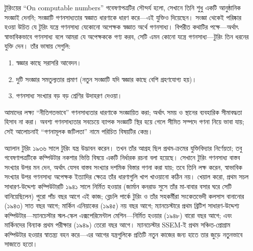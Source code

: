 \documentclass[../../../include/open-logic-section]{subfiles}
\begin{document}
\begin{digress}
টুরিংয়ের “On computable numbers” গবেষণাপত্রটির সৌন্দর্য হলো, সেখানে তিনি
শুধু একটি আনুষ্ঠানিক সংজ্ঞাই দেননি; সংজ্ঞাটি গণনসাধ্যতার স্বজ্ঞাত ধারণাকে
ধারণ করে—এই যুক্তিও দিয়েছেন। সংজ্ঞা থেকেই পরিষ্কার হওয়া উচিত যে টুরিং
যন্ত্রে গণনসাধ্য যেকোনো অপেক্ষক স্বজ্ঞাত অর্থে গণনসাধ্য। বিপরীত কথাটির
পক্ষে—অর্থাৎ স্বাভাবিকভাবে গণনসাধ্য বলে আমরা যে অপেক্ষককে গণ্য করব, সেটি
এমন কোনো যন্ত্রে গণনসাধ্য—টুরিং তিন ধরনের যুক্তি দেন। তাঁর ভাষায় সেগুলি:
\begin{enumerate}
\item স্বজ্ঞার কাছে সরাসরি আবেদন।
\item দুটি সংজ্ঞার সমতুল্যতার প্রমাণ (নতুন সংজ্ঞাটি যদি স্বজ্ঞার কাছে
  বেশি গ্রহণযোগ্য হয়)।
\item গণনসাধ্য সংখ্যার বড় বড় শ্রেণির উদাহরণ দেওয়া।
\end{enumerate}
আমাদের লক্ষ্য “নীতিগতভাবে” গণনসাধ্যতার ধারণাকে সংজ্ঞায়িত করা; অর্থাৎ
সময় ও স্থানের ব্যবহারিক সীমাবদ্ধতা হিসাব না করা। অবশ্য গণনসাধ্যতার
সবচেয়ে ব্যাপক সংজ্ঞাটি স্থির হয়ে গেলে সীমিত সম্পদে গণনা নিয়ে ভাবা যায়;
সেই আলোচনাই “গণনামূলক জটিলতা” নামে পরিচিত বিষয়টির কেন্দ্র।
\end{digress}

\begin{history}
অ্যালান টুরিং ১৯৩৬ সালে টুরিং যন্ত্র উদ্ভাবন করেন। তখন তাঁর আগ্রহ ছিল
প্রথম-ক্রমের যুক্তিবিদ্যার নির্ণেয়তা; তবু গবেষণাপত্রটিকে কম্পিউটার নকশার
ভিত্তি বিষয়ে একটি নির্ধারক রচনা বলা হয়েছে। সেখানে টুরিং গণনসাধ্য বাস্তব
সংখ্যার উপর মন দেন, অর্থাৎ যেসব বাস্তব সংখ্যার দশমিক বিস্তার গণনা করা
যায়; তবে তিনি লক্ষ করেন, স্বাভাবিক সংখ্যার উপর গণনসাধ্য অপেক্ষক ইত্যাদির
ক্ষেত্রে তাঁর ধারণাগুলি খাপ খাওয়ানো কঠিন নয়। খেয়াল করো, প্রথম সচল
সাধারণ-উদ্দেশ্য কম্পিউটারটি ১৯৪১ সালে নির্মিত হওয়ার (জার্মান কনরাড সুসে
তাঁর মা-বাবার বসার ঘরে সেটি বানিয়েছিলেন) পুরো পাঁচ বছর আগে এই কাজ;
ব্লেচলি পার্কে টুরিং ও তাঁর সহকর্মীরা সংকেতভেদী কলসাস বানানোর (১৯৪৩)
সাত বছর আগে; মার্কিন এনিয়াকের (১৯৪৫) নয় বছর আগে; ম্যানচেস্টারে প্রথম
ব্রিটিশ সাধারণ-উদ্দেশ্য কম্পিউটার—ম্যানচেস্টার স্মল-স্কেল এক্সপেরিমেন্টাল
মেশিন—নির্মিত হওয়ার (১৯৪৮) বারো বছর আগে; এবং মার্কিনদের বিন্যাক প্রথম
পরীক্ষার (১৯৪৯) তেরো বছর আগে। ম্যানচেস্টার SSEM-ই প্রথম সঞ্চিত-প্রোগ্রাম
কম্পিউটার হওয়ার স্বাতন্ত্র্য বহন করে—এর আগের যন্ত্রগুলিকে প্রতিটি নতুন
কাজের জন্য হাতে তার জুড়ে নতুনভাবে সাজাতে হতো।
\end{history}
\end{document}
